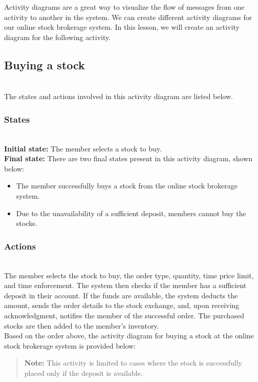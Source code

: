 

Activity diagrams are a great way to visualize the flow of messages from one activity to another in the system. We can create different activity diagrams for our online stock brokerage system. In this lesson, we will create an activity diagram for the following activity.

\subsection{Buying a stock}\label{7oS9vjFZWIT0cQ9beGBZN}
\\
The states and actions involved in this activity diagram are listed below.

\subsubsection{States}\label{U3fHkmnDGEncpbS611Tyg}
\\
\textbf{Initial state:} The member selects a stock to buy.
\\
\textbf{Final state:} There are two final states present in this activity diagram, shown below:

\begin{itemize}
\item
\protect{}\label{pg5dmNxY8iZzzXRlyZRsY}
The member successfully buys a stock from the online stock brokerage system.
\item
\protect{}\label{uk7g5Wkv5mhI5RaideAIb}
Due to the unavailability of a sufficient deposit, members cannot buy the stocks.
\end{itemize}

\subsubsection{Actions}\label{ii09dWdbdtKfw7mkqa8iY}
\\
The member selects the stock to buy, the order type, quantity, time price limit, and time enforcement. The system then checks if the member has a sufficient deposit in their account. If the funds are available, the system deducts the amount, sends the order details to the stock exchange, and, upon receiving acknowledgment, notifies the member of the successful order. The purchased stocks are then added to the member's inventory.
\\
Based on the order above, the activity diagram for buying a stock at the online stock brokerage system is provided below:
\begin{quote}
\textbf{Note:} This activity is limited to cases where the stock is successfully placed only if the deposit is available.
\end{quote}

